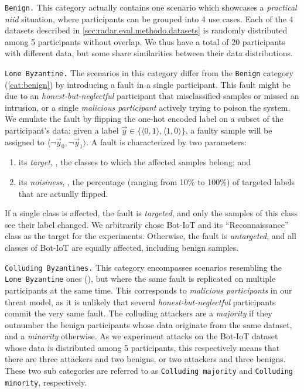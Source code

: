 \begin{categories}
  \item \texttt{Benign.} This category actually contains one scenario which showcases a \emph{practical \gls{niid}} situation, where participants can be grouped into 4 use cases.
  Each of the 4 datasets described in \ref{sec:radar.eval.methodo.datasets} is randomly distributed among 5 participants without overlap.
  We thus have a total of 20 participants with different data, but some share similarities between their data distributions.
  \label{cat:benign}

  \item \texttt{Lone Byzantine.} The scenarios in this category differ from the \texttt{Benign} category (\ref{cat:benign}) by introducing a fault in a single participant.
  This fault might be due to an \emph{honest-but-neglectful} participant that misclassified samples or missed an intrusion, or a single \emph{malicious participant} actively trying to poison the system.
  We emulate the fault by flipping the one-hot encoded label on a subset of the participant's data: given a label $\Vec{y} \in \{\langle0,1\rangle,\langle1,0\rangle\}$, a faulty sample will be assigned to $\langle \neg\Vec{y}_0, \neg\Vec{y}_1 \rangle$. 
  A fault is characterized by two parameters: 
  \begin{enumerate}[(1)]
      \item its \emph{target}, \ie, the classes to which the affected samples belong; and 
      \item its \emph{noisiness}, \ie, the percentage (ranging from 10\% to 100\%) of targeted labels that are actually flipped. 
  \end{enumerate}
  If a single class is affected, the fault is \emph{targeted}, and only the samples of this class see their label changed.
  We arbitrarily chose Bot-IoT and its ``Reconnaissance'' class as the target for the experiments.
  Otherwise, the fault is \emph{untargeted}, and all classes of Bot-IoT are equally affected, including benign samples.
  \label{cat:lone}
  
  \item \texttt{Colluding Byzantines.} This category encompasses scenarios resembling the \texttt{Lone Byzantine} ones (), but where the same fault is replicated on multiple participants at the same time.
  This corresponds to \emph{malicious participants} in our threat model, as it is unlikely that several \emph{honest-but-neglectful} participants commit the very same fault.
  The colluding attackers are a \emph{majority} if they outnumber the benign participants whose data originate from the same dataset, and a \emph{minority} otherwise.
  As we experiment attacks on the Bot-IoT dataset whose data is distributed among 5 participants, this respectively means that there are three attackers and two benigns, or two attackers and three benigns.
  These two sub categories are referred to as \texttt{Colluding majority} and \texttt{Colluding minority}, respectively.
  \label{cat:colluding}
\end{categories}

